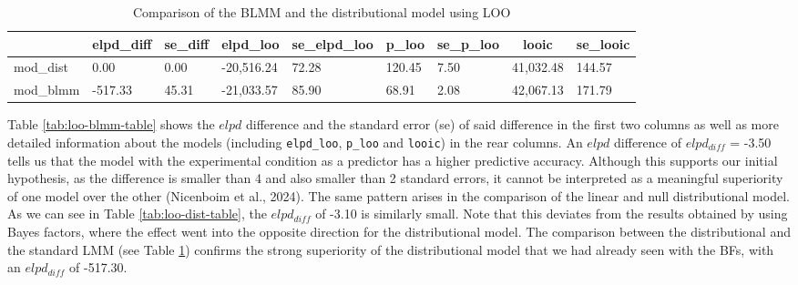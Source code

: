 \documentclass[
  doc,12pt,floatsintext]{apa7}
\begin{document}
\begin{table}[tbp]

\begin{center}
\begin{threeparttable}

\caption{\label{tab:loo-blmm-dist-table}Comparison of the BLMM and the distributional model using LOO}

\begin{tabular}{lllllllll}
\toprule
 & \multicolumn{1}{c}{elpd\_diff} & \multicolumn{1}{c}{se\_diff} & \multicolumn{1}{c}{elpd\_loo} & \multicolumn{1}{c}{se\_elpd\_loo} & \multicolumn{1}{c}{p\_loo} & \multicolumn{1}{c}{se\_p\_loo} & \multicolumn{1}{c}{looic} & \multicolumn{1}{c}{se\_looic}\\
\midrule
mod\_dist & 0.00 & 0.00 & -20,516.24 & 72.28 & 120.45 & 7.50 & 41,032.48 & 144.57\\
mod\_blmm & -517.33 & 45.31 & -21,033.57 & 85.90 & 68.91 & 2.08 & 42,067.13 & 171.79\\
\bottomrule
\end{tabular}

\end{threeparttable}
\end{center}

\end{table}

Table \ref{tab:loo-blmm-table} shows the \(elpd\) difference and the standard error (se) of said difference in the first two columns as well as more detailed information about the models (including \texttt{elpd\_loo}, \texttt{p\_loo} and \texttt{looic}) in the rear columns. An \(elpd\) difference of \(elpd_{diff}\) = -3.50 tells us that the model with the experimental condition as a predictor has a higher predictive accuracy. Although this supports our initial hypothesis, as the difference is smaller than 4 and also smaller than 2 standard errors, it cannot be interpreted as a meaningful superiority of one model over the other (Nicenboim et al., 2024). The same pattern arises in the comparison of the linear and null distributional model. As we can see in Table \ref{tab:loo-dist-table}, the \(elpd_{diff}\) of -3.10 is similarly small. Note that this deviates from the results obtained by using Bayes factors, where the effect went into the opposite direction for the distributional model. The comparison between the distributional and the standard LMM (see Table \ref{tab:loo-blmm-dist-table}) confirms the strong superiority of the distributional model that we had already seen with the BFs, with an \(elpd_{diff}\) of -517.30.
\end{document}
